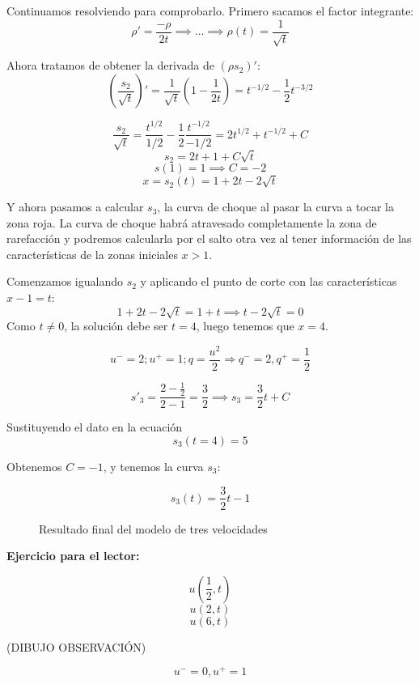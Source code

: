 \begin{example}
			Continuamos resolviendo para comprobarlo. Primero sacamos el factor integrante: \[ \rho' = \frac{-\rho}{2t} \implies … \implies \rho(t) = \frac{1}{\sqrt{t}} \]

			Ahora tratamos de obtener la derivada de $(ρs_2)'$: \
			\[ \left(\frac{s_2}{\sqrt{t}}\right)' = \frac{1}{\sqrt{t}} \left( 1 - \frac{1}{2t}\right) = t^{-1/2} - \frac{1}{2} t^{-3/2} \]

			$$\frac{s_2}{\sqrt{t}} = \frac{t^{1/2}}{1/2} - \frac{1}{2} \frac{t^{-1/2}}{-1/2} = 2t^{1/2} + t^{-1/2} + C$$
			$$ s_2 = 2t + 1 + C \sqrt{t} $$
			$$ s(1) = 1 \implies C = -2 $$
			$$ x = s_2 (t) = 1 + 2t - 2 \sqrt{t} $$

			Y ahora pasamos a calcular $s_3$, la curva de choque al pasar la curva a tocar la zona roja. La curva de choque habrá atravesado completamente la zona de rarefacción y podremos calcularla por el salto otra vez al tener información de las características de la zonas iniciales $x>1$.

			Comenzamos igualando $s_2$ y aplicando el punto de corte con las características $x-1=t$:
			$$ 1+2t - 2 \sqrt{t} = 1 + t \implies t- 2 \sqrt{t} = 0$$
			Como $t\neq 0$, la solución debe ser $t=4$, luego tenemos que $x=4$.

			$$u^{-} = 2 ; u^{+} = 1; q = \frac{u^2}{2} \Rightarrow q^{-} = 2, q^{+} = \frac{1}{2}$$

			$$s'_3 = \frac{2 - \frac{1}{2}}{2 - 1} = \frac{3}{2} \implies s_3 = \frac{3}{2} t + C$$

			Sustituyendo el dato en la ecuación
			$$s_3 (t = 4) = 5$$

			Obtenemos $C = -1$, y tenemos la curva $s_3$:

			$$s_3(t) = \frac{3}{2} t - 1$$


			\begin{figure}[hbtp]
				\centering
				\caption{Resultado final del modelo de tres velocidades}
				\label{fig:ModeloTresVelocidades}
			\end{figure}



			\textbf{Ejercicio para el lector:}

			$$u(\frac{1}{2},t)$$
			$$u(2,t)$$
			$$u(6,t)$$


		\end{example}

		\obs

		(DIBUJO OBSERVACIÓN)

		$$u^{-} = 0, u^+ = 1$$

